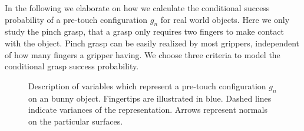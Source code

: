 In the following we elaborate on how we calculate the conditional success probability of a pre-touch configuration $g_n$ for real world objects. Here we only study the pinch grasp, that a grasp only requires two fingers to make contact with the object. Pinch grasp can be easily realized by most grippers, independent of how many fingers a gripper having. We choose three criteria to model the conditional grasp success probability. 

\begin{figure}[!htbp]
\centering
\def\svgwidth{0.7\linewidth}

\caption{Description of variables which represent a pre-touch configuration $g_n$ on an bunny object. Fingertips are illustrated in blue. Dashed lines indicate variances of the representation. Arrows represent normals on the particular surfaces.}
\label{fig:grasp_generation}
\end{figure}

